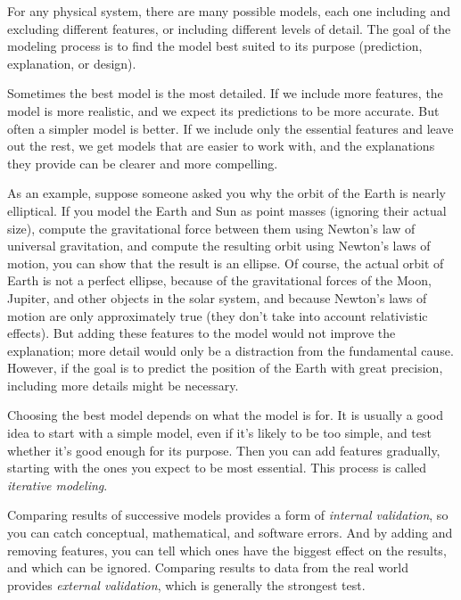 For any physical system, there are many possible models, each one including and excluding different features, or including different levels of detail.  The goal of the modeling process is to find the model best suited to its purpose (prediction, explanation, or design).


Sometimes the best model is the most detailed.  If we include more features, the model is more realistic, and we expect its predictions to be more accurate.  
But often a simpler model is better.  If we include only the essential features and leave out the rest, we get models that are easier to work with, and the explanations they provide can be clearer and more compelling. 

As an example, suppose someone asked you why the orbit of the Earth is nearly elliptical.  If you model the Earth and Sun as point masses (ignoring their actual size), compute the gravitational force between them using Newton's law of universal gravitation, and compute the resulting orbit using Newton's laws of motion, you can show that the result is an ellipse.  
Of course, the actual orbit of Earth is not a perfect ellipse, because of the gravitational forces of the Moon, Jupiter, and other objects in the solar system, and because Newton's laws of motion are only approximately true (they don't take into account relativistic effects).
But adding these features to the model would not improve the explanation; more detail would only be a distraction from the fundamental cause.  However, if the goal is to predict the position of the Earth with great precision, including more details might be necessary.  

Choosing the best model depends on what the model is for.  It is usually a good idea to start with a simple model, even if it's likely to be too simple, and test whether it's good enough for its purpose.  Then you can add features gradually, starting with the ones you expect to be most essential.  This process is called \emph{iterative modeling}.


Comparing results of successive models provides a form of \emph{internal validation}, so you can catch conceptual, mathematical, and software errors.  And by adding and removing features, you can tell which ones have the biggest effect on the results, and which can be ignored.
Comparing results to data from the real world provides \emph{external validation}, which is generally the strongest test.

